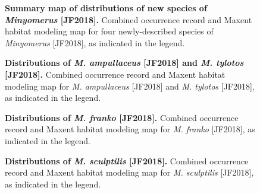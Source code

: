 \documentclass[fleqn,10pt,lineno]{wlpeerj} %
\begin{document}
\begin{figure}[h]
	\centering
	\caption{\textbf{Summary map of distributions of new species of \textit{Minyomerus} [JF2018].} Combined occurrence record and Maxent habitat modeling map for four newly-described species of \textit{Minyomerus} [JF2018], as indicated in the legend.}
	\label{fig:map_summary}
\end{figure}

\begin{figure}[h]
	\centering
	\caption{\textbf{Distributions of \textit{M. ampullaceus} [JF2018] and \textit{M. tylotos} [JF2018].} Combined occurrence record and Maxent habitat modeling map for \textit{M. ampullaceus} [JF2018] and \textit{M. tylotos} [JF2018], as indicated in the legend.}
	\label{fig:map_amptyl}
\end{figure}

\begin{figure}[h]
	\centering
	\caption{\textbf{Distributions of \textit{M. franko} [JF2018].} Combined occurrence record and Maxent habitat modeling map for \textit{M. franko} [JF2018], as indicated in the legend.}
	\label{fig:map_franko}
\end{figure}

\begin{figure}[h]
	\centering
	\begin{sideways}
		\end{sideways}
	\caption{\textbf{Distributions of \textit{M. sculptilis} [JF2018].} Combined occurrence record and Maxent habitat modeling map for \textit{M. sculptilis} [JF2018], as indicated in the legend.}
	\label{fig:map_sculptilis}
\end{figure}
\end{document}
